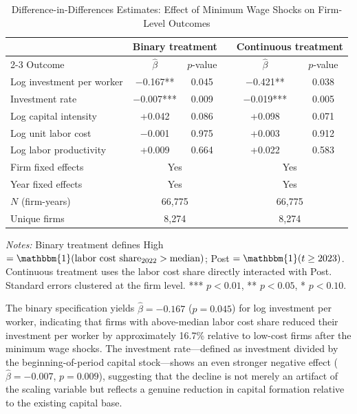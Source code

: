 \documentclass[5p,times,authoryear]{elsarticle}
\begin{document}
\begin{table}[htbp]
\centering
\begin{threeparttable}
\caption{Difference-in-Differences Estimates: Effect of Minimum Wage Shocks on Firm-Level Outcomes}
\label{tab:did_main}
\small
\setlength{\tabcolsep}{5pt}
\begin{tabular}{@{}lccccc@{}}
\toprule
& \multicolumn{2}{c}{Binary treatment} & & \multicolumn{2}{c}{Continuous treatment} \\
\cmidrule{2-3} \cmidrule{5-6}
Outcome & $\hat{\beta}$ & $p$-value & & $\hat{\beta}$ & $p$-value \\
\midrule
Log investment per worker & $-$0.167** & 0.045 & & $-$0.421** & 0.038 \\
Investment rate & $-$0.007*** & 0.009 & & $-$0.019*** & 0.005 \\
Log capital intensity & +0.042 & 0.086 & & +0.098 & 0.071 \\
Log unit labor cost & $-$0.001 & 0.975 & & +0.003 & 0.912 \\
Log labor productivity & +0.009 & 0.664 & & +0.022 & 0.583 \\
\midrule
Firm fixed effects & \multicolumn{2}{c}{Yes} & & \multicolumn{2}{c}{Yes} \\
Year fixed effects & \multicolumn{2}{c}{Yes} & & \multicolumn{2}{c}{Yes} \\
$N$ (firm-years) & \multicolumn{2}{c}{66,775} & & \multicolumn{2}{c}{66,775} \\
Unique firms & \multicolumn{2}{c}{8,274} & & \multicolumn{2}{c}{8,274} \\
\bottomrule
\end{tabular}
\begin{tablenotes}
\footnotesize
\item \textit{Notes:} Binary treatment defines High $= \mathbbm{1}(\text{labor cost share}_{2022} > \text{median})$; Post $= \mathbbm{1}(t \geq 2023)$. Continuous treatment uses the labor cost share directly interacted with Post. Standard errors clustered at the firm level. *** $p<0.01$, ** $p<0.05$, * $p<0.10$.
\end{tablenotes}
\end{threeparttable}
\end{table}

The binary specification yields $\hat{\beta} = -0.167$ ($p = 0.045$) for log investment per worker, indicating that firms with above-median labor cost share reduced their investment per worker by approximately 16.7\% relative to low-cost firms after the minimum wage shocks. The investment rate---defined as investment divided by the beginning-of-period capital stock---shows an even stronger negative effect ($\hat{\beta} = -0.007$, $p = 0.009$), suggesting that the decline is not merely an artifact of the scaling variable but reflects a genuine reduction in capital formation relative to the existing capital base.
\end{document}
